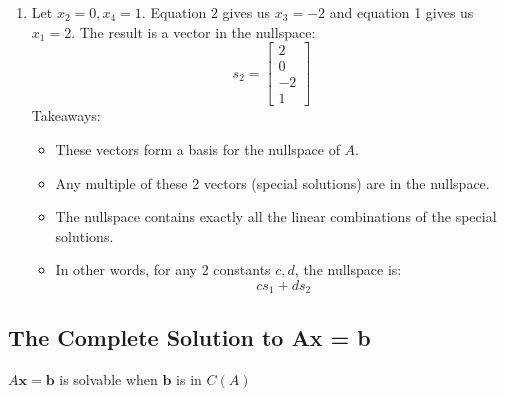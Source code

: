 \documentclass[11pt]{article}
\begin{document}
\begin{enumerate}
\begin{enumerate}
        \item Let $x_2 = 0, x_4 = 1$. Equation 2 gives us $x_3 = -2$ and equation 1 gives us 
        $x_1 = 2$. The result is a vector in the nullspace: \[ s_2 = \begin{bmatrix}
            2 \\
            0 \\
            -2 \\
            1
        \end{bmatrix}
    \]
    Takeaways: 
    \begin{itemize}
        \item These vectors form a basis for the nullspace of $A$. 
        \item Any multiple of these 2 vectors (special solutions) are in the nullspace.
        \item The nullspace contains exactly all the linear combinations of the special 
        solutions. 
        \item In other words, for any 2 constants $c, d$, the nullspace is: \[ cs_1 + ds_2 \]
    \end{itemize} 
    \end{enumerate}
\end{enumerate}

\subsection{The Complete Solution to Ax = b}

$A\boldsymbol{x} = \boldsymbol{b}$ is solvable when $\boldsymbol{b}$ is in $C(A)$ \\
\end{document}
